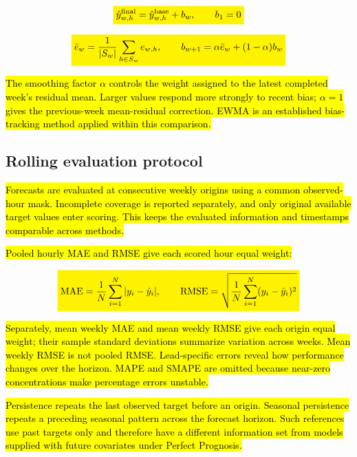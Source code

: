 \documentclass[pdflatex,sn-basic,Numbered]{sn-jnl}
\newcommand{\rev}[1]{\hl{#1}}
\newcommand{\revmath}[1]{\colorbox{yellow}{$\displaystyle #1$}}
\begin{document}
\begin{equation}
\revmath{\hat y^{\mathrm{final}}_{w,h}=\hat y^{\mathrm{base}}_{w,h}+b_w,\qquad b_1=0}
\label{eq:corrected}
\end{equation}

\begin{equation}
\revmath{\bar e_w=\frac{1}{|S_w|}\sum_{h\in S_w}e_{w,h},\qquad b_{w+1}=\alpha\bar e_w+(1-\alpha)b_w}
\label{eq:ewma}
\end{equation}

\rev{The smoothing factor $\alpha$ controls the weight assigned to the latest completed week's residual mean. Larger values respond more strongly to recent bias; $\alpha=1$ gives the previous-week mean-residual correction. EWMA is an established bias-tracking method applied within this comparison.}

\subsection{Rolling evaluation protocol}\label{subsec:evaluation}

\rev{Forecasts are evaluated at consecutive weekly origins using a common observed-hour mask. Incomplete coverage is reported separately, and only original available target values enter scoring. This keeps the evaluated information and timestamps comparable across methods.}

\rev{Pooled hourly MAE and RMSE give each scored hour equal weight:}

\begin{equation}
\revmath{\mathrm{MAE}=\frac{1}{N}\sum_{i=1}^{N}|y_i-\hat y_i|,\qquad \mathrm{RMSE}=\sqrt{\frac{1}{N}\sum_{i=1}^{N}(y_i-\hat y_i)^2}}
\label{eq:metrics}
\end{equation}

\rev{Separately, mean weekly MAE and mean weekly RMSE give each origin equal weight; their sample standard deviations summarize variation across weeks. Mean weekly RMSE is not pooled RMSE. Lead-specific errors reveal how performance changes over the horizon. MAPE and SMAPE are omitted because near-zero concentrations make percentage errors unstable.}

\rev{Persistence repeats the last observed target before an origin. Seasonal persistence repeats a preceding seasonal pattern across the forecast horizon. Such references use past targets only and therefore have a different information set from models supplied with future covariates under Perfect Prognosis.}
\end{document}
